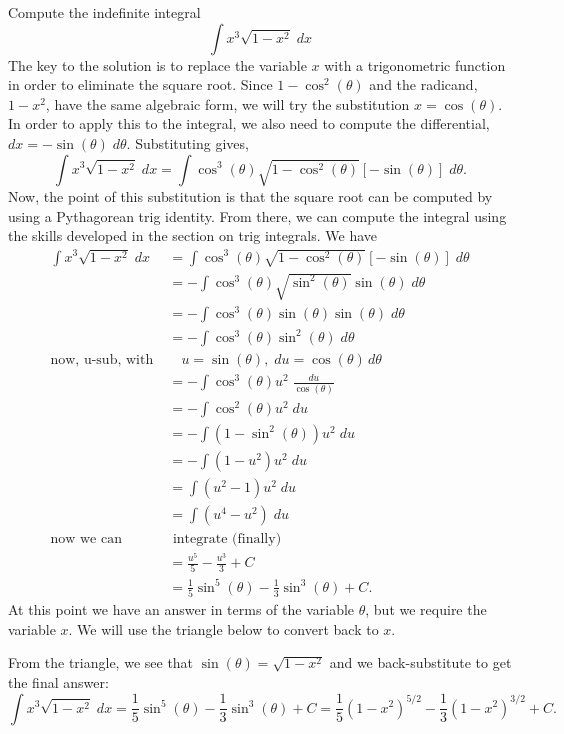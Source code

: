 \documentclass{ximera}
\begin{document}
\begin{example}
Compute the indefinite integral
\[
\int x^3 \sqrt{1-x^2} \; dx
\]
The key to the solution is to replace the variable $x$ with a trigonometric function 
in order to eliminate the square root.
Since $1-\cos^2(\theta)$ and the radicand, $1-x^2$,
have the same algebraic form, we will try the substitution $x = \cos(\theta)$.
In order to apply this to the integral, we also need to compute the differential, 
$dx = -\sin(\theta) \; d\theta$.
Substituting gives,
\[
\int x^3 \sqrt{1-x^2} \; dx = \int \cos^3(\theta) \sqrt{1-\cos^2(\theta)} [-\sin(\theta)] \; d\theta.
\]
Now, the point of this substitution is that the square root can be computed by
using a
Pythagorean trig identity. From there, we can compute the integral
using the skills developed in the section on trig integrals.
We have
\begin{align*}
\int x^3 \sqrt{1-x^2} \; dx &= \int \cos^3(\theta) \sqrt{1-\cos^2(\theta)} [-\sin(\theta)] \; d\theta\\
                           &= -\int \cos^3(\theta) \sqrt{\sin^2(\theta)} \sin(\theta) \; d\theta\\
                           &= -\int \cos^3(\theta) \sin(\theta) \sin(\theta) \; d\theta\\
                           &= -\int \cos^3(\theta) \sin^2(\theta) \; d\theta\\
                           \text{now, u-sub, with} \; & \; \text{  $u = \sin(\theta), \; du = \cos(\theta) \, d\theta$}\\
                           &=-\int \cos^3(\theta) u^2 \; \frac{du}{\cos(\theta)}\\
                           &=-\int \cos^2(\theta) u^2 \; du\\
                           &=-\int (1-\sin^2(\theta)) u^2 \; du\\
                           &=-\int (1-u^2)u^2 \; du\\
                           &=\int (u^2 -1)u^2 \; du\\
                           &=\int (u^4 - u^2) \; du\\
                           \text{now we can} & \text{ integrate (finally)}\\
                           &=\frac{u^5}{5} - \frac{u^3}{3} + C\\
                           &= \frac15 \sin^5(\theta) - \frac13 \sin^3(\theta) + C.
\end{align*}
At this point we have an answer in terms of the variable $\theta$, but we require the variable $x$.
We will use the triangle below to convert back to $x$.


From the triangle, we see that $\sin(\theta) = \sqrt{1 - x^2}$ and we back-substitute 
to get the final answer:
\[
\int x^3 \sqrt{1-x^2} \; dx = \frac15 \sin^5(\theta) - \frac13 \sin^3(\theta) + C = \frac15 (1-x^2)^{5/2} - \frac13 (1-x^2)^{3/2} + C.
\]

\end{example}
\end{document}
